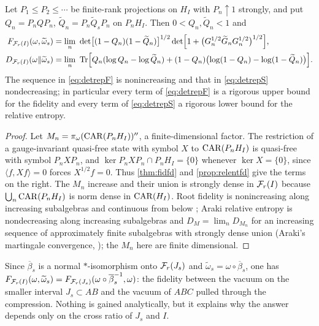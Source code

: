 \begin{theorem}\label{thm:detrep}
Let $P_1\le P_2\le\cdots$ be finite-rank projections on $H_I$ with $P_n\uparrow1$
strongly, and put $Q_n=P_nQP_n$, $\widetilde Q_n=P_n\widetilde Q_sP_n$ on $P_nH_I$.
Then $0<Q_n,\widetilde Q_n<1$ and
\begin{align}
 F_{\mathcal F_r(I)}(\omega,\widetilde\omega_s)
 &=\lim_n\ \det\bigl[(1-Q_n)(1-\widetilde Q_n)\bigr]^{1/2}
 \det\Bigl[1+\bigl(G_n^{1/2}\widetilde G_nG_n^{1/2}\bigr)^{1/2}\Bigr],
 \label{eq:detrepF}\\
 D_{\mathcal F_r(I)}(\omega\Vert\widetilde\omega_s)
 &=\lim_n\ \operatorname{Tr}\Bigl[Q_n(\log Q_n-\log\widetilde Q_n)
 +(1-Q_n)\bigl(\log(1-Q_n)-\log(1-\widetilde Q_n)\bigr)\Bigr].
 \label{eq:detrepS}
\end{align}
The sequence in \eqref{eq:detrepF} is nonincreasing and that in \eqref{eq:detrepS}
nondecreasing; in particular every term of \eqref{eq:detrepF} is a rigorous upper
bound for the fidelity and every term of \eqref{eq:detrepS} a rigorous lower bound
for the relative entropy.
\end{theorem}

\begin{proof}
Let $M_n=\pi_\omega(\mathrm{CAR}(P_nH_I))''$, a finite-dimensional factor.  The
restriction of a gauge-invariant quasi-free state with symbol $X$ to
$\mathrm{CAR}(P_nH_I)$ is quasi-free with symbol $P_nXP_n$, and
$\ker P_nXP_n\cap P_nH_I=\{0\}$ whenever $\ker X=\{0\}$, since
$\langle f,Xf\rangle=0$ forces $X^{1/2}f=0$.  Thus \cref{thm:fidfd} and
\cref{prop:relentfd} give the terms on the right.  The $M_n$ increase and their
union is strongly dense in $\mathcal F_r(I)$ because $\bigcup_n\mathrm{CAR}(P_nH_I)$ is norm
dense in $\mathrm{CAR}(H_I)$.  Root fidelity is nonincreasing along increasing
subalgebras and continuous from below \cite[Lemma~10.1]{Note4}; Araki relative
entropy is nondecreasing along increasing subalgebras and
$D_M=\lim_nD_{M_n}$ for an increasing sequence of approximately finite
subalgebras with strongly dense union (Araki's martingale convergence,
\cite[Thm.~3.9(2) with Thm.~3.8(2)($\gamma$)]{Araki77}); the $M_n$ here are
finite dimensional.
\end{proof}

\begin{remark}
Since $\overline\beta_s$ is a normal $*$-isomorphism onto $\mathcal F_r(J_s)$ and
$\widetilde\omega_s=\omega\circ\overline\beta_s$, one has
$F_{\mathcal F_r(I)}(\omega,\widetilde\omega_s)
=F_{\mathcal F_r(J_s)}(\omega\circ\overline\beta_s^{-1},\omega)$: the fidelity between
the vacuum on the smaller interval $J_s\subset AB$ and the vacuum of $ABC$ pulled
through the compression.  Nothing is gained analytically, but it explains why the
answer depends only on the cross ratio of $J_s$ and $I$.
\end{remark}

